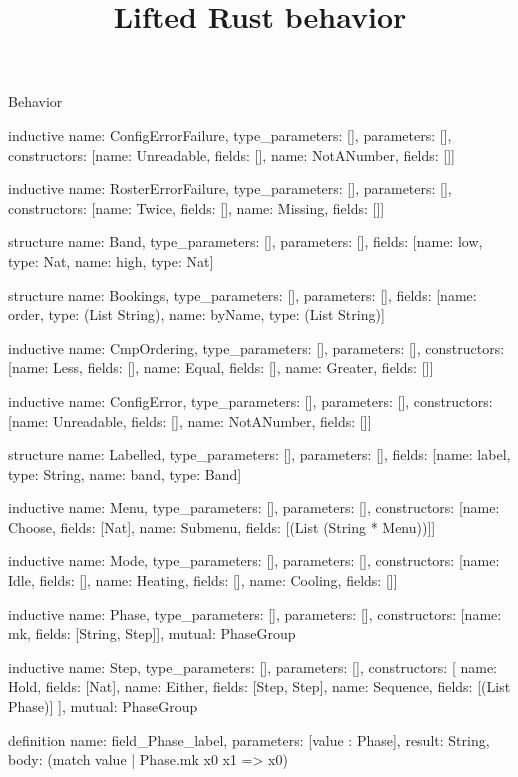 \begin{lexlean}{Behavior}
\title{Lifted Rust behavior}
\begin{semanticmodule}
inductive{
  name: ConfigErrorFailure,
  type_parameters: [],
  parameters: [],
  constructors: [{name: Unreadable, fields: []}, {name: NotANumber, fields: []}]
}

inductive{
  name: RosterErrorFailure,
  type_parameters: [],
  parameters: [],
  constructors: [{name: Twice, fields: []}, {name: Missing, fields: []}]
}

structure{
  name: Band,
  type_parameters: [],
  parameters: [],
  fields: [{name: low, type: Nat}, {name: high, type: Nat}]
}

structure{
  name: Bookings,
  type_parameters: [],
  parameters: [],
  fields: [{name: order, type: (List String)}, {name: byName, type: (List String)}]
}

inductive{
  name: CmpOrdering,
  type_parameters: [],
  parameters: [],
  constructors: [{name: Less, fields: []}, {name: Equal, fields: []}, {name: Greater, fields: []}]
}

inductive{
  name: ConfigError,
  type_parameters: [],
  parameters: [],
  constructors: [{name: Unreadable, fields: []}, {name: NotANumber, fields: []}]
}

structure{
  name: Labelled,
  type_parameters: [],
  parameters: [],
  fields: [{name: label, type: String}, {name: band, type: Band}]
}

inductive{
  name: Menu,
  type_parameters: [],
  parameters: [],
  constructors: [{name: Choose, fields: [Nat]}, {name: Submenu, fields: [(List (String * Menu))]}]
}

inductive{
  name: Mode,
  type_parameters: [],
  parameters: [],
  constructors: [{name: Idle, fields: []}, {name: Heating, fields: []}, {name: Cooling, fields: []}]
}

inductive{
  name: Phase,
  type_parameters: [],
  parameters: [],
  constructors: [{name: mk, fields: [String, Step]}],
  mutual: PhaseGroup
}

inductive{
  name: Step,
  type_parameters: [],
  parameters: [],
  constructors: [
    {name: Hold, fields: [Nat]},
    {name: Either, fields: [Step, Step]},
    {name: Sequence, fields: [(List Phase)]}
  ],
  mutual: PhaseGroup
}

definition{
  name: field_Phase_label,
  parameters: [value : Phase],
  result: String,
  body: (match value | Phase.mk x0 x1 => x0)
}


\end{semanticmodule}
\end{lexlean}
